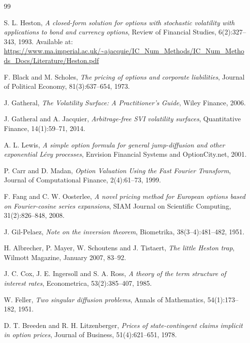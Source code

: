\documentclass[11pt,a4paper]{article}
\theoremstyle{plain}
\theoremstyle{definition}
\begin{document}
\begin{thebibliography}{99}

S. L. Heston,
\textit{A closed-form solution for options with stochastic volatility with applications to bond and currency options},
Review of Financial Studies, 6(2):327--343, 1993.
Available at: \url{https://www.ma.imperial.ac.uk/~ajacquie/IC_Num_Methods/IC_Num_Methods_Docs/Literature/Heston.pdf}

F. Black and M. Scholes,
\textit{The pricing of options and corporate liabilities},
Journal of Political Economy, 81(3):637--654, 1973.

J. Gatheral,
\textit{The Volatility Surface: A Practitioner's Guide},
Wiley Finance, 2006.

J. Gatheral and A. Jacquier,
\textit{Arbitrage-free SVI volatility surfaces},
Quantitative Finance, 14(1):59--71, 2014.

A. L. Lewis,
\textit{A simple option formula for general jump-diffusion and other exponential L\'evy processes},
Envision Financial Systems and OptionCity.net, 2001.

P. Carr and D. Madan,
\textit{Option Valuation Using the Fast Fourier Transform},
Journal of Computational Finance, 2(4):61--73, 1999.

F. Fang and C. W. Oosterlee,
\textit{A novel pricing method for European options based on Fourier-cosine series expansions},
SIAM Journal on Scientific Computing, 31(2):826--848, 2008.

J. Gil-Pelaez,
\textit{Note on the inversion theorem},
Biometrika, 38(3--4):481--482, 1951.

H. Albrecher, P. Mayer, W. Schoutens and J. Tistaert,
\textit{The little Heston trap},
Wilmott Magazine, January 2007, 83--92.

J. C. Cox, J. E. Ingersoll and S. A. Ross,
\textit{A theory of the term structure of interest rates},
Econometrica, 53(2):385--407, 1985.

W. Feller,
\textit{Two singular diffusion problems},
Annals of Mathematics, 54(1):173--182, 1951.

D. T. Breeden and R. H. Litzenberger,
\textit{Prices of state-contingent claims implicit in option prices},
Journal of Business, 51(4):621--651, 1978.


\end{thebibliography}
\end{document}
